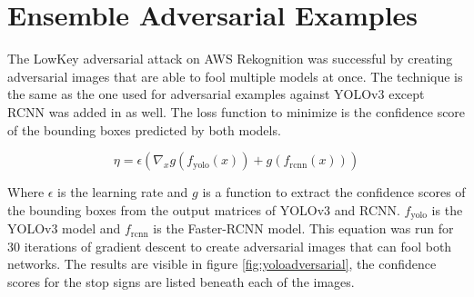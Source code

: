 \documentclass{article}
\begin{document}
\section{Ensemble Adversarial Examples}

The LowKey adversarial attack \cite{cherepanova2021lowkey} on AWS Rekognition was successful by creating adversarial images that are able to fool multiple models at once. The technique is the same as the one used for adversarial examples against YOLOv3 \cite{redmon2018yolov3} except RCNN \cite{ren2016faster} was added in as well. The loss function to minimize is the confidence score of the bounding boxes predicted by both models.

\begin{equation}
    \eta = \epsilon (\nabla_x g(f_{\text{yolo}}(x)) + g(f_{\text{rcnn}}(x)))
\end{equation}

Where $\epsilon$ is the learning rate and $g$ is a function to extract the confidence scores of the bounding boxes from the output matrices of YOLOv3 and RCNN. $f_{\text{yolo}}$ is the YOLOv3 model and $f_{\text{rcnn}}$ is the Faster-RCNN model. This equation was run for 30 iterations of gradient descent to create adversarial images that can fool both networks. The results are visible in figure \ref{fig:yoloadversarial}, the confidence scores for the stop signs are listed beneath each of the images.
\end{document}
